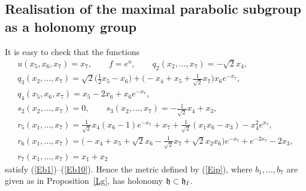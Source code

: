 \documentclass[11pt]{article}
\numberwithin{equation}{section}
\newcommand\fh{{\frak h}}
\begin{document}
 \subsection{Realisation of the maximal parabolic subgroup as a holonomy group}\label{S3.2}
 It is easy to check that the functions
 \begin{gather*}
 u(x_5,x_6,x_7)=x_7,\qquad f=e^u,\qquad q_2(x_2,\dots,x_7) = -\sqrt 2x_4,\\
 q_3(x_2,\dots,x_7)= \sqrt 2\big(\tfrac12 x_5-x_6\big)+ \big( {-}x_4 +x_5+\tfrac 1{\sqrt 2}x_7 \big)x_6e^{-x_7},\\
 q_4(x_5,x_6,x_7)=x_5-2x_6+x_6e^{-x_7},\\
 s_2(x_2,\dots,x_7) =0,\qquad
 s_3(x_2,\dots,x_7) =-\tfrac1{\sqrt 2}x_4 +x_3 ,\\
 r_5(x_1,\dots,x_7) =\tfrac1{\sqrt 2} x_4(x_6-1)e^{-x_7} +x_7 + \tfrac1{\sqrt 2}(x_1 x_6 -x_3) -x_4^2 e^{x_7} ,\\
 r_6(x_1,\dots,x_7) =\big( {-}x_4+x_5+\sqrt2 x_6 -\tfrac1{\sqrt 2} x_7+\sqrt2 x_2 x_6 \big) e^{-x_7} + e^{-2x_7} -2x_3 ,\\
 r_7(x_1,\dots,x_7) = x_1+x_2
 \end{gather*}
 satisfy (\ref{Eb1})--(\ref{Eb10}). Hence the metric defined by (\ref{Eip}), where $b_1,\dots, b_7$ are given as in Proposition~\ref{Lg}, has holonomy $\fh\subset \fh_I$.
\end{document}
